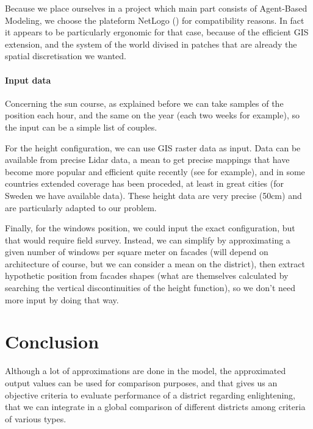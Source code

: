 \documentclass[english]{article}
\begin{document}
Because we place ourselves in a project which main part consists of
Agent-Based Modeling, we choose the plateform NetLogo (\cite{NetLogo})
for compatibility reasons. In fact it appears to be particularly ergonomic
for that case, because of the efficient GIS extension, and the system
of the world divised in patches that are already the spatial discretisation
we wanted.


\paragraph*{Input data}

Concerning the sun course, as explained before we can take samples
of the position each hour, and the same on the year (each two weeks
for example), so the input can be a simple list of couples.

For the height configuration, we can use GIS raster data as input.
Data can be available from precise Lidar data, a mean to get precise
mappings that have become more popular and efficient quite recently
(see \cite{2004PhDT.......212H} for example), and in some countries
extended coverage has been proceded, at least in great cities (for
Sweden we have available data). These height data are very precise
(50cm) and are particularly adapted to our problem.

Finally, for the windows position, we could input the exact configuration,
but that would require field survey. Instead, we can simplify by approximating
a given number of windows per square meter on facades (will depend
on architecture of course, but we can consider a mean on the district),
then extract hypothetic position from facades shapes (what are themselves
calculated by searching the vertical discontinuities of the height
function), so we don't need more input by doing that way.


\section*{Conclusion}

Although a lot of approximations are done in the model, the approximated
output values can be used for comparison purposes, and that gives
us an objective criteria to evaluate performance of a district regarding
enlightening, that we can integrate in a global comparison of different
districts among criteria of various types.



\end{document}
